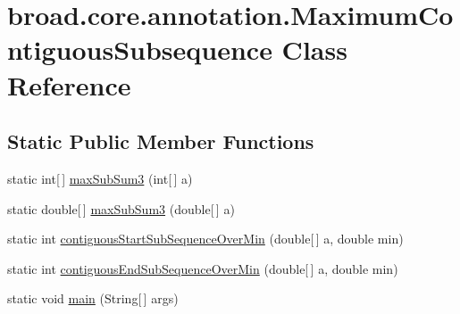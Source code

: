 \hypertarget{classbroad_1_1core_1_1annotation_1_1_maximum_contiguous_subsequence}{\section{broad.\+core.\+annotation.\+Maximum\+Contiguous\+Subsequence Class Reference}
\label{classbroad_1_1core_1_1annotation_1_1_maximum_contiguous_subsequence}
}
\subsection*{Static Public Member Functions}
\begin{DoxyCompactItemize}
\item 
static int\mbox{[}$\,$\mbox{]} \hyperlink{classbroad_1_1core_1_1annotation_1_1_maximum_contiguous_subsequence_a739cb8ca66abe40ccc3dfdf8764cb920}{max\+Sub\+Sum3} (int\mbox{[}$\,$\mbox{]} a)
\item 
static double\mbox{[}$\,$\mbox{]} \hyperlink{classbroad_1_1core_1_1annotation_1_1_maximum_contiguous_subsequence_a26b0c5e2ccba833c178e71352c683b45}{max\+Sub\+Sum3} (double\mbox{[}$\,$\mbox{]} a)
\item 
static int \hyperlink{classbroad_1_1core_1_1annotation_1_1_maximum_contiguous_subsequence_a340ad2ccb44aae075f97b65b41c60194}{contiguous\+Start\+Sub\+Sequence\+Over\+Min} (double\mbox{[}$\,$\mbox{]} a, double min)
\item 
static int \hyperlink{classbroad_1_1core_1_1annotation_1_1_maximum_contiguous_subsequence_a8e7167f5b84cac82a44d3cddfc39976d}{contiguous\+End\+Sub\+Sequence\+Over\+Min} (double\mbox{[}$\,$\mbox{]} a, double min)
\item 
static void \hyperlink{classbroad_1_1core_1_1annotation_1_1_maximum_contiguous_subsequence_a1762dd14d94c2702312ff3414a913153}{main} (String\mbox{[}$\,$\mbox{]} args)
\end{DoxyCompactItemize}


